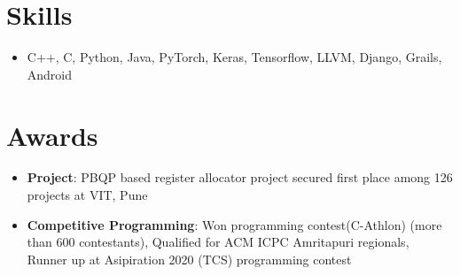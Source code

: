\documentclass[letterpaper,11pt]{article}
\newcommand{\resumeItem}[2]{
  \item\small{
    \textbf{#1}{: #2 \vspace{-2pt}}
  }
}
\newcommand{\resumeSubItem}[2]{\resumeItem{#1}{#2}\vspace{-4pt}}
\newcommand{\resumeSubHeadingListStart}{\begin{itemize}[leftmargin=*]}
\newcommand{\resumeSubHeadingListEnd}{\end{itemize}}
\begin{document}
%
\section{Skills}
  \resumeSubHeadingListStart
    \item{
      \textbf{}{C++, C, Python, Java, PyTorch, Keras, Tensorflow, LLVM, Django, Grails, Android}
      \hfill
    }
  \resumeSubHeadingListEnd


%
\section{Awards}
\resumeSubHeadingListStart
    \resumeSubItem{Project}{PBQP based register allocator project secured first place among 126 projects at VIT, Pune}
      \resumeSubItem{Competitive Programming}{Won programming contest(C-Athlon) (more than 600 contestants), Qualified for ACM ICPC Amritapuri regionals, Runner up at Asipiration 2020 (TCS) programming contest}
   \resumeSubHeadingListEnd
\end{document}
